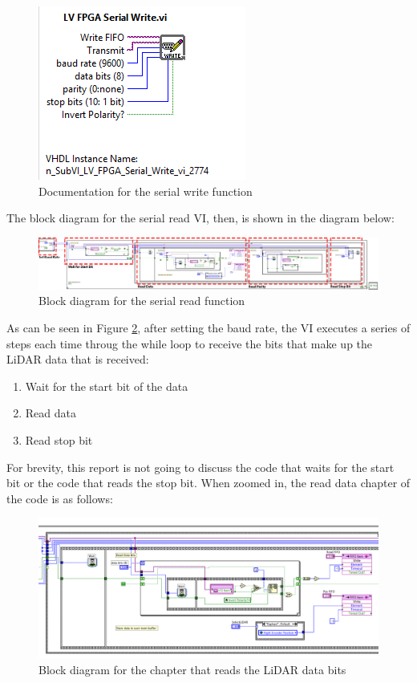 \begin{figure}[h!]
\centering
\includegraphics[scale=0.75]{Photos/writedocs.png}
\caption{Documentation for the serial write function}
\label{fig:writedocs}
\end{figure}

\newpage

\noindent The block diagram for the serial read VI, then, is shown in the diagram below:

\begin{figure}[h!]
\centering
\includegraphics[scale=0.35]{Photos/serialreadblock.png}
\caption{Block diagram for the serial read function}
\label{fig:serialreadblock}
\end{figure}

\noindent As can be seen in Figure \ref{fig:serialreadblock}, after setting the baud rate, the VI executes a series of steps each time throug the while loop to receive the bits that make up the LiDAR data that is received:

\begin{enumerate}
\item Wait for the start bit of the data
\item Read data
\item Read stop bit
\end{enumerate}

\noindent For brevity, this report is not going to discuss the code that waits for the start bit or the code that reads the stop bit. When zoomed in, the read data chapter of the code is as follows:

\begin{figure}[h!]
\centering
\includegraphics[scale=0.85]{Photos/readdatasection.png}
\caption{Block diagram for the chapter that reads the LiDAR data bits}
\label{fig:readdatachapter}
\end{figure}

